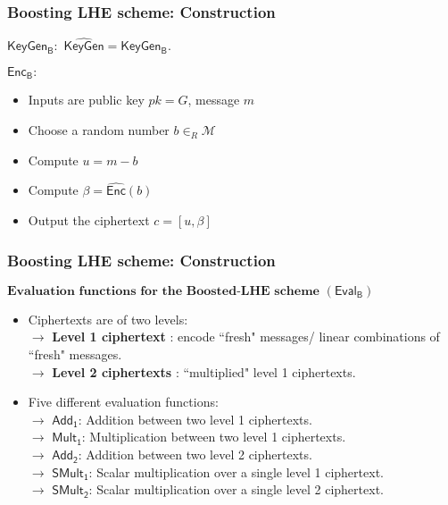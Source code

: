 \documentclass{beamer}
\begin{document}
\begin{frame}[t]
\frametitle{ Boosting LHE scheme: Construction}
\begin{block}{$\mathsf{KeyGen_B:}$}
 $\widehat{\mathsf{KeyGen}}=\mathsf{KeyGen_B}$. 
\end{block}
\vspace*{3mm}
\begin{block}{$\mathsf{Enc_{B}:}$}
\begin{itemize}
\item Inputs are public key $pk=G$, message $m$
\item Choose a random number $b\in_R \mathcal{M}$
\item Compute $u = m-b$
\item Compute  $\beta =\mathsf{\widehat{\mathsf{Enc}}}(b)$ 
\item Output the ciphertext $c=[u,\beta]$
\end{itemize} 
\end{block}
\end{frame}


\begin{frame}[t]
\frametitle{Boosting LHE scheme: Construction}
$\textbf{Evaluation functions for the Boosted-LHE scheme}\,\,(\mathsf{Eval_B})$
\vspace*{2mm}
\begin{itemize}
\item Ciphertexts are of two levels: \\$\rightarrow$ \textbf{Level 1 ciphertext} : encode ``fresh" messages/ linear combinations of ``fresh" messages.\\
\vspace*{1mm}
$\rightarrow$ \textbf{Level 2 ciphertexts} : ``multiplied" level 1 ciphertexts.
\vspace*{5mm}
\item Five different evaluation functions:\\
\vspace*{2mm}
$\rightarrow$ $\mathbf{\mathsf{Add_1}}$: Addition between two level 1 ciphertexts.\\
\vspace*{1mm}
$\rightarrow$ $\mathbf{\mathsf{Mult_1}}$: Multiplication between two level 1 ciphertexts.\\
\vspace*{1mm}
$\rightarrow$ $\mathbf{\mathsf{Add_2}}$: Addition between two level 2 ciphertexts.\\
\vspace*{1mm}
$\rightarrow$ $\mathbf{\mathsf{SMult_1}}$: Scalar multiplication over a single level 1 ciphertext.\\
\vspace*{1mm}
$\rightarrow$ $\mathbf{\mathsf{SMult_2}}$: Scalar multiplication over a single level 2 ciphertext.
\end{itemize}
\end{frame}
\end{document}

